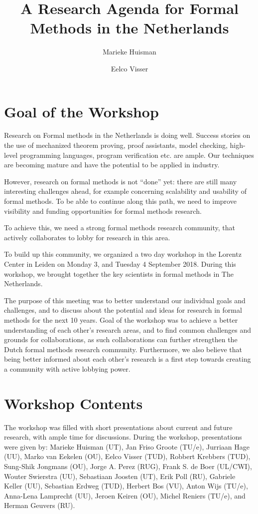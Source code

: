 \documentclass[sigplan,10pt,review,svgnames]{acmart}\settopmatter{printfolios=true,printccs=false,printacmref=false}
\title{A Research Agenda for Formal Methods in the Netherlands}         %
\author{Marieke Huisman}
\affiliation{
  \institution{University of Twente}            %
}
\author{Eelco Visser}
\affiliation{
\institution{Technical University of Delft}
}
\begin{document}
\maketitle

\section{Goal of the Workshop}
Research on Formal methods in the Netherlands is doing well. Success stories on the use of mechanized theorem proving, proof assistants, model checking, high-level programming languages, program verification etc. are ample. Our techniques are becoming mature and have the potential to be applied in industry.

However, research on formal methods is not ``done'' yet: there are still many interesting challenges ahead, for example concerning scalability and usability of formal methods. To be able to continue along this path, we need to improve visibility and funding opportunities for formal methods research.

To achieve this, we need a strong formal methods research community, that actively collaborates to lobby for research in this area.


To build up this community, we organized a two day workshop in the
Lorentz Center in Leiden on Monday 3, and Tuesday 4 September
2018. During this workshop, we brought together the key scientists in formal methods in The Netherlands.

The purpose of this meeting was to better understand our individual
goals and challenges, and to discuss about the potential and ideas for
research in formal methods for the next 10 years.  Goal of the
workshop was to achieve a better understanding of each other's
research areas, and to find common challenges and grounds for
collaborations, as such collaborations can further strengthen the
Dutch formal methods research community. Furthermore, we also believe
that being better informed about each other's research is a first step
towards creating a community with active lobbying power.

\section{Workshop Contents}
The workshop was filled with short presentations about current and
future research, with ample time for discussions. During the workshop,
presentations were given by: Marieke Huisman (UT), Jan Friso Groote
(TU/e), Jurriaan  Hage (UU), Marko  van Eekelen (OU), Eelco  Visser
(TUD), Robbert  Krebbers (TUD), Sung-Shik  Jongmans (OU), Jorge
 A. Perez (RUG), Frank  S. de Boer (UL/CWI), Wouter  Swierstra (UU), Sebastiaan
 Joosten (UT), Erik  Poll (RU), Gabriele Keller (UU), Sebastian
 Erdweg (TUD), Herbert  Bos (VU), Anton  Wijs (TU/e), 
Anna-Lena
 Lamprecht (UU),
 Jeroen Keiren (OU), Michel Reniers (TU/e), and Herman Geuvers (RU).
\end{document}
